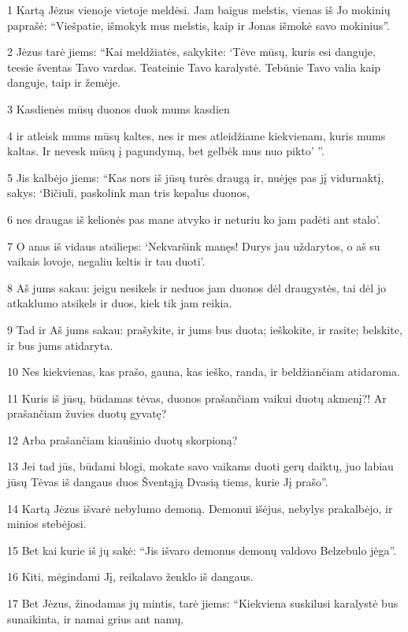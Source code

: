 \par 1 Kartą Jėzus vienoje vietoje meldėsi. Jam baigus melstis, vienas iš Jo mokinių paprašė: “Viešpatie, išmokyk mus melstis, kaip ir Jonas išmokė savo mokinius”. 
\par 2 Jėzus tarė jiems: “Kai meldžiatės, sakykite: ‘Tėve mūsų, kuris esi danguje, teesie šventas Tavo vardas. Teateinie Tavo karalystė. Tebūnie Tavo valia kaip danguje, taip ir žemėje. 
\par 3 Kasdienės mūsų duonos duok mums kasdien 
\par 4 ir atleisk mums mūsų kaltes, nes ir mes atleidžiame kiekvienam, kuris mums kaltas. Ir nevesk mūsų į pagundymą, bet gelbėk mus nuo pikto’ ”. 
\par 5 Jis kalbėjo jiems: “Kas nors iš jūsų turės draugą ir, nuėjęs pas jį vidurnaktį, sakys: ‘Bičiuli, paskolink man tris kepalus duonos, 
\par 6 nes draugas iš kelionės pas mane atvyko ir neturiu ko jam padėti ant stalo’. 
\par 7 O anas iš vidaus atsilieps: ‘Nekvaršink manęs! Durys jau uždarytos, o aš su vaikais lovoje, negaliu keltis ir tau duoti’. 
\par 8 Aš jums sakau: jeigu nesikels ir neduos jam duonos dėl draugystės, tai dėl jo atkaklumo atsikels ir duos, kiek tik jam reikia. 
\par 9 Tad ir Aš jums sakau: prašykite, ir jums bus duota; ieškokite, ir rasite; belskite, ir bus jums atidaryta. 
\par 10 Nes kiekvienas, kas prašo, gauna, kas ieško, randa, ir beldžiančiam atidaroma. 
\par 11 Kuris iš jūsų, būdamas tėvas, duonos prašančiam vaikui duotų akmenį?! Ar prašančiam žuvies­ duotų gyvatę? 
\par 12 Arba prašančiam kiaušinio­ duotų skorpioną? 
\par 13 Jei tad jūs, būdami blogi, mokate savo vaikams duoti gerų daiktų, juo labiau jūsų Tėvas iš dangaus duos Šventąją Dvasią tiems, kurie Jį prašo”. 
\par 14 Kartą Jėzus išvarė nebylumo demoną. Demonui išėjus, nebylys prakalbėjo, ir minios stebėjosi. 
\par 15 Bet kai kurie iš jų sakė: “Jis išvaro demonus demonų valdovo Belzebulo jėga”. 
\par 16 Kiti, mėgindami Jį, reikalavo ženklo iš dangaus. 
\par 17 Bet Jėzus, žinodamas jų mintis, tarė jiems: “Kiekviena suskilusi karalystė bus sunaikinta, ir namai grius ant namų. 
